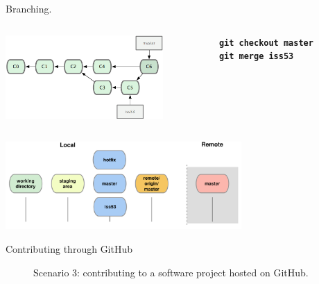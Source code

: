 \documentclass{beamer}
\begin{document}
\begin{frame}{Branching.}
  \begin{columns}
    \begin{column}{0.6\linewidth}
      \begin{center}
        \includegraphics[width=6cm]{UniBo.IDSEPC.A2022.LavoroCondiviso/18333fig0317-tn}
      \end{center}
    \end{column}
    \begin{column}{0.45\linewidth}
      \begin{center}
        \texttt{\textbf{git checkout master}}\\
        \texttt{\textbf{git merge iss53}}
      \end{center}
    \end{column}
  \end{columns}
  \begin{center}
    \includegraphics[width=9cm]{UniBo.IDSEPC.A2022.LavoroCondiviso/git-branch2}
  \end{center}
\end{frame}


\begin{frame}{Contributing through GitHub}
  \begin{figure}
    \centering
    Scenario 3: contributing to a software project hosted on GitHub.
  \end{figure}
\end{frame}
\end{document}
